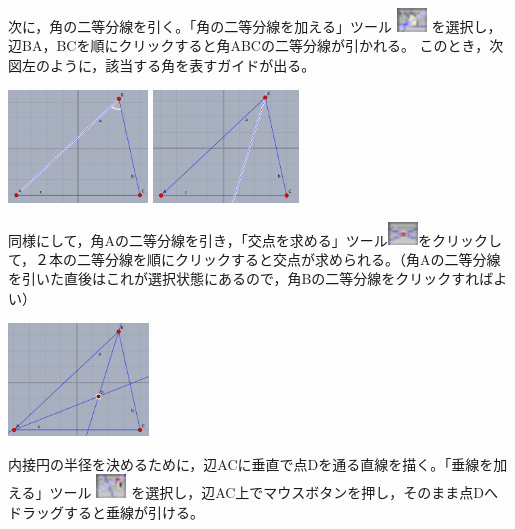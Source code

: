 \documentclass[papersize,a4paper,12pt,uplatex]{jsarticle}
\begin{document}
次に，角の二等分線を引く。「角の二等分線を加える」ツール \includegraphics[bb=0.00 0.00 6.48 5.04,width=8mm]{Fig/bisector.pdf} を選択し，辺BA，BCを順にクリックすると角ABCの二等分線が引かれる。 このとき，次図左のように，該当する角を表すガイドが出る。

\hspace{20mm}\includegraphics[bb=0.00 0.00 402.02 325.02,height=3cm]{Fig/start03.pdf} \hspace{5mm}\includegraphics[bb=0.00 0.00 413.02 320.02,height=3cm]{Fig/start04.pdf}

同様にして，角Aの二等分線を引き，「交点を求める」ツール\includegraphics[bb=0.00 0.00 6.48 5.04,width=8mm]{Fig/intersection.pdf}をクリックして，２本の二等分線を順にクリックすると交点が求められる。（角Aの二等分線を引いた直後はこれが選択状態にあるので，角Bの二等分線をクリックすればよい）

\begin{center}\includegraphics[bb=0.00 0.00 397.02 319.02,height=3cm]{Fig/start05.pdf}\end{center}

内接円の半径を決めるために，辺ACに垂直で点Dを通る直線を描く。「垂線を加える」ツール \includegraphics[bb=0.00 0.00 6.48 5.04,width=8mm]{Fig/multi-add-perp.pdf} を選択し，辺AC上でマウスボタンを押し，そのまま点Dへドラッグすると垂線が引ける。
\end{document}

